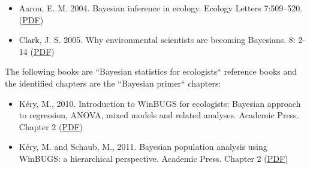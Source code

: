 \begin{itemize}
\item Aaron, E. M. 2004. Bayesian inference in ecology. Ecology Letters 7:509–520. (\href{https://tinyurl.com/ya7d57qk}{PDF})
\item Clark, J. S. 2005. Why environmental scientists are becoming Bayesians. 8: 2-14 (\href{https://tinyurl.com/ycguf6w9}{PDF})
\end{itemize}

The following books are ``Bayesian statistics for ecologists`` reference books and the identified chapters are the ``Bayesian primer`` chapters:

\begin{itemize}
\item Kéry, M., 2010. Introduction to WinBUGS for ecologists: Bayesian approach to regression, ANOVA, mixed models and related analyses. Academic Press. Chapter 2 (\href{https://tinyurl.com/ycguf6w9}{PDF})
\item Kéry, M. and Schaub, M., 2011. Bayesian population analysis using WinBUGS: a hierarchical perspective. Academic Press. Chapter 2 (\href{https://tinyurl.com/ydyl9ont}{PDF})
\end{itemize}
